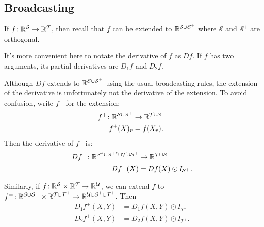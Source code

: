 \subsection{Broadcasting}

If $f \colon \mathbb{R}^\mathcal{S} \rightarrow \mathbb{R}^\mathcal{T}$, then recall that $f$ can be extended to $\mathbb{R}^{\mathcal{S} \cup \mathcal{S^+}}$ where $\mathcal{S}$ and $\mathcal{S^+}$ are orthogonal.

It's more convenient here to notate the derivative of $f$ as $Df$. If $f$ has two arguments, its partial derivatives are $D_1 f$ and $D_2 f$.

Although $Df$ extends to $\mathbb{R}^{\mathcal{S} \cup \mathcal{S^+}}$ using the usual broadcasting rules, the extension of the derivative is unfortunately not the derivative of the extension. To avoid confusion, write $f^+$ for the extension:
\begin{align*}
  f^+ \colon \mathbb{R}^{\mathcal{S} \cup \mathcal{S^+}} &\rightarrow \mathbb{R}^{\mathcal{T} \cup \mathcal{S^+}} \\
  f^+(X)_r &= f(X_r).
\end{align*}
Then the derivative of $f^+$ is:
\begin{align*}
  Df^+ \colon \mathbb{R}^{\mathcal{S}^* \cup \mathcal{{S^+}}^* \cup \mathcal{T} \cup \mathcal{S^+}} &\rightarrow \mathbb{R}^{\mathcal{T} \cup \mathcal{S^+}} \\
  Df^+(X) &= Df(X) \odot I_{\mathcal{S}^+}.
\end{align*}  

Similarly, if $f \colon \mathbb{R}^\mathcal{S} \times \mathbb{R}^\mathcal{T} \rightarrow \mathbb{R}^\mathcal{U}$, we can extend $f$ to $f^+ \colon \mathbb{R}^\mathcal{S \cup S^+} \times \mathbb{R}^\mathcal{T \cup T^+} \rightarrow \mathbb{R}^\mathcal{U \cup S^+ \cup T^+}$. Then
\begin{align*}
  D_1 f^+(X, Y) &= D_1 f(X, Y) \odot I_{\mathcal{S}^+} \\
  D_2 f^+(X, Y) &= D_2 f(X, Y) \odot I_{\mathcal{T}^+}.
\end{align*}

